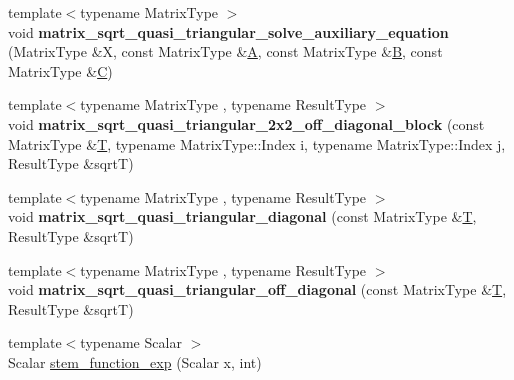 \begin{DoxyCompactItemize}
\item 
\mbox{\label{namespace_eigen_1_1internal_a691211492c8b69df5c7391bd1de411c4}} 
{\footnotesize template$<$typename Matrix\+Type $>$ }\\void {\bfseries matrix\+\_\+sqrt\+\_\+quasi\+\_\+triangular\+\_\+solve\+\_\+auxiliary\+\_\+equation} (Matrix\+Type \&X, const Matrix\+Type \&\hyperlink{group___core___module_class_eigen_1_1_matrix}{A}, const Matrix\+Type \&\hyperlink{group___core___module_class_eigen_1_1_matrix}{B}, const Matrix\+Type \&\hyperlink{group___core___module}{C})
\item 
\mbox{\label{namespace_eigen_1_1internal_ac968fcd5f7206aef781631df79524727}} 
{\footnotesize template$<$typename Matrix\+Type , typename Result\+Type $>$ }\\void {\bfseries matrix\+\_\+sqrt\+\_\+quasi\+\_\+triangular\+\_\+2x2\+\_\+off\+\_\+diagonal\+\_\+block} (const Matrix\+Type \&\hyperlink{group___sparse_core___module}{T}, typename Matrix\+Type\+::\+Index i, typename Matrix\+Type\+::\+Index j, Result\+Type \&sqrtT)
\item 
\mbox{\label{namespace_eigen_1_1internal_a8e5c9733af465bc14851019818a5d2b3}} 
{\footnotesize template$<$typename Matrix\+Type , typename Result\+Type $>$ }\\void {\bfseries matrix\+\_\+sqrt\+\_\+quasi\+\_\+triangular\+\_\+diagonal} (const Matrix\+Type \&\hyperlink{group___sparse_core___module}{T}, Result\+Type \&sqrtT)
\item 
\mbox{\label{namespace_eigen_1_1internal_a95c0b49fec5ce44af43283d7f541d341}} 
{\footnotesize template$<$typename Matrix\+Type , typename Result\+Type $>$ }\\void {\bfseries matrix\+\_\+sqrt\+\_\+quasi\+\_\+triangular\+\_\+off\+\_\+diagonal} (const Matrix\+Type \&\hyperlink{group___sparse_core___module}{T}, Result\+Type \&sqrtT)
\item 
\mbox{\label{namespace_eigen_1_1internal_a0e7bafccf7fa66d965ab6c59444a39c3}} 
{\footnotesize template$<$typename Scalar $>$ }\\Scalar \hyperlink{namespace_eigen_1_1internal_a0e7bafccf7fa66d965ab6c59444a39c3}{stem\+\_\+function\+\_\+exp} (Scalar x, int)

\end{DoxyCompactItemize}
